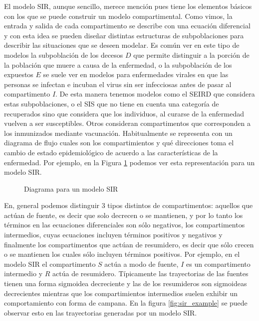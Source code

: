 El modelo SIR, aunque sencillo, merece mención pues tiene los elementos básicos con los que se puede construir un modelo compartimental. Como vimos, la entrada y salida de cada compartimento se describe con una ecuación diferencial y con esta idea se pueden diseñar distintas estructuras de subpoblaciones para describir las situaciones que se deseen modelar. Es común ver en este tipo de modelos la subpoblación de los decesos $D$ que permite distinguir a la porción de la población que muere a causa de la enfermedad, o la subpoblación de los expuestos $E$ se suele ver en modelos para enfermedades virales en que las personas se infectan e incuban el virus sin ser infecciosas antes de pasar al compartimento $I$. De esta manera tenemos modelos como el SEIRD que considera estas subpoblaciones, o el SIS que no tiene en cuenta una categoría de recuperados sino que considera que los individuos, al curarse de la enfermedad vuelven a ser susceptibles. Otros consideran compartimentos que corresponden a los inmunizados mediante vacunación. Habitualmente se representa con un diagrama de flujo cuales son los compartimientos y qué direcciones toma el cambio de estado epidemiológico de acuerdo a las características de la enfermedad. Por ejemplo, en la Figura \ref{dia:sir} podemos ver esta representación para un modelo SIR.
\begin{figure}[h]
    \centering
    \caption{Diagrama para un modelo SIR} \label{dia:sir}
\end{figure}

En, general podemos distinguir 3 tipos distintos de compartimentos: aquellos que actúan de fuente, es decir que solo decrecen o se mantienen, y por lo tanto los términos en las ecuaciones diferenciales son sólo negativos, los compartimentos intermedios, cuyas ecuaciones incluyen términos positivos y negativos y finalmente los compartimentos que actúan de resumidero, es decir que sólo crecen o se mantienen los cuales sólo incluyen términos positivos. Por ejemplo, en el modelo SIR el compartimento $S$ actúa a modo de fuente, $I$ es un compartimento intermedio y $R$ actúa de resumidero. Típicamente las trayectorias de las fuentes tienen una forma sigmoidea decreciente y las de los resumideros son sigmoideas decrecientes mientras que los compartimientos intermedios suelen exhibir un comportamiento con forma de campana. En la figura \ref{fig:sir_example} se puede observar esto en las trayectorias generadas por un modelo SIR.

